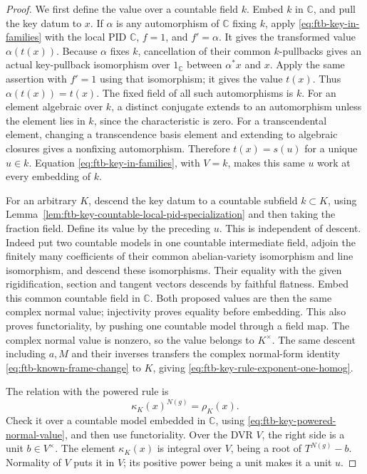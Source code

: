 \begin{proof}
We first define the value over a countable field \(k\).
Embed \(k\) in \(\mathbb C\), and pull the key datum to \(x\).
If \(\alpha\) is any automorphism of \(\mathbb C\) fixing \(k\),
apply \eqref{eq:ftb-key-in-families} with the local PID
\(\mathbb C\), \(f=1\), and \(f'=\alpha\).
It gives the transformed value \(\alpha(t(x))\).
Because \(\alpha\) fixes \(k\), cancellation of their common
\(k\)-pullbacks gives an actual key-pullback isomorphism over
\(1_{\mathbb C}\) between \(\alpha^*x\) and \(x\).
Apply the same assertion with \(f'=1\) using that isomorphism;
it gives the value \(t(x)\).
Thus \(\alpha(t(x))=t(x)\).
The fixed field of all such automorphisms is \(k\).
For an element algebraic over \(k\), a distinct conjugate
extends to an automorphism unless the element lies in \(k\),
since the characteristic is zero.
For a transcendental element, changing a transcendence
basis element and extending to algebraic closures gives
a nonfixing automorphism.
Therefore \(t(x)=s(u)\) for a unique \(u\in k\).
Equation \eqref{eq:ftb-key-in-families}, with \(V=k\), makes
this same \(u\) work at every embedding of \(k\).

For an arbitrary \(K\), descend the key datum to a
countable subfield \(k\subset K\), using
Lemma~\ref{lem:ftb-key-countable-local-pid-specialization} and then taking
the fraction field.
Define its value by the preceding \(u\).
This is independent of descent.
Indeed put two countable models in one countable
intermediate field, adjoin the finitely many coefficients
of their common abelian-variety isomorphism and line
isomorphism, and descend these isomorphisms.
Their equality with the given rigidification, section
and tangent vectors descends by faithful flatness.
Embed this common countable field in \(\mathbb C\).
Both proposed values are then the same complex normal
value; injectivity proves equality before embedding.
This also proves functoriality, by pushing one countable
model through a field map.
The complex normal value is nonzero, so the value belongs
to \(K^\times\).
The same descent including \(a,M\) and their inverses
transfers the complex normal-form identity
\eqref{eq:ftb-known-frame-change} to \(K\), giving
\eqref{eq:ftb-key-rule-exponent-one-homog}.

The relation with the powered rule is
\[
                             \kappa_K(x)^{N(g)}=\rho_K(x).
 \tag{S6}\label{eq:ftb-key-root-powered-algebraic}
\]
Check it over a countable model embedded in \(\mathbb C\),
using \eqref{eq:ftb-key-powered-normal-value}, and then
use functoriality.
Over the DVR \(V\), the right side is a unit \(b\in V^\times\).
The element \(\kappa_K(x)\) is integral over \(V\), being
a root of \(T^{N(g)}-b\).
Normality of \(V\) puts it in \(V\); its positive power
being a unit makes it a unit \(u\).


\end{proof}
